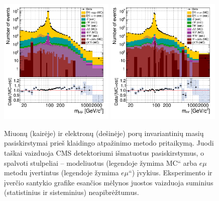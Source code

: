 \documentclass[a4paper, 12pt, oneside]{article}
\newcommand{\emu}{e\mu}
\newcommand{\ltq}[1]{{\quotedblbase{}#1\textquotedblleft{}}}
\newlength\q
\begin{document}
\begin{figure}[b!]
	\includegraphics[width=0.49\textwidth]{Magistrinis/MuMumass_beforeFR.png}
	\includegraphics[width=0.49\textwidth]{Magistrinis/EEmass_beforeFR.png}
	\vspace{-0.5cm}
	\caption{\label{fig:MassBefore}
		Miuonų (kairėje) ir elektronų (dešinėje) porų invariantinių masių pasiskirstymai prieš klaidingo atpažinimo metodo
		pritaikymą.
		Juodi taškai vaizduoja CMS detektoriumi išmatuotus pasiskirstymus, o spalvoti stulpeliai -- modeliuotus (legendoje
		žymima \ltq{MC} arba $\emu$ metodu įvertintus (legendoje žymima \ltq{$\emu$}) įvykius.
		Eksperimento ir įverčio santykio grafike esančios mėlynos juostos vaizduoja suminius (statistinius ir sisteminius)
		neapibrėžtumus.}
\end{figure}
\end{document}
